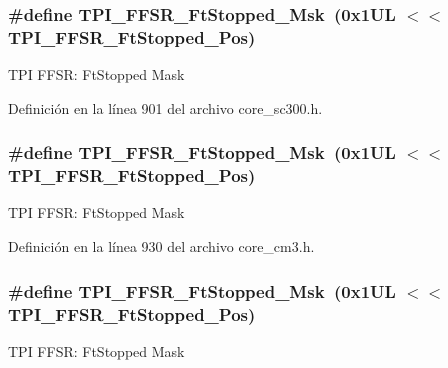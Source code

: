 \subsubsection[{\texorpdfstring{T\+P\+I\+\_\+\+F\+F\+S\+R\+\_\+\+Ft\+Stopped\+\_\+\+Msk}{TPI_FFSR_FtStopped_Msk}}]{\setlength{\rightskip}{0pt plus 5cm}\#define T\+P\+I\+\_\+\+F\+F\+S\+R\+\_\+\+Ft\+Stopped\+\_\+\+Msk~(0x1\+U\+L $<$$<$ T\+P\+I\+\_\+\+F\+F\+S\+R\+\_\+\+Ft\+Stopped\+\_\+\+Pos)}\hypertarget{group___c_m_s_i_s___t_p_i_ga1ab6c3abe1cf6311ee07e7c479ce5f78}{}\label{group___c_m_s_i_s___t_p_i_ga1ab6c3abe1cf6311ee07e7c479ce5f78}
T\+PI F\+F\+SR\+: Ft\+Stopped Mask 

Definición en la línea 901 del archivo core\+\_\+sc300.\+h.

\subsubsection[{\texorpdfstring{T\+P\+I\+\_\+\+F\+F\+S\+R\+\_\+\+Ft\+Stopped\+\_\+\+Msk}{TPI_FFSR_FtStopped_Msk}}]{\setlength{\rightskip}{0pt plus 5cm}\#define T\+P\+I\+\_\+\+F\+F\+S\+R\+\_\+\+Ft\+Stopped\+\_\+\+Msk~(0x1\+U\+L $<$$<$ T\+P\+I\+\_\+\+F\+F\+S\+R\+\_\+\+Ft\+Stopped\+\_\+\+Pos)}\hypertarget{group___c_m_s_i_s___t_p_i_ga1ab6c3abe1cf6311ee07e7c479ce5f78}{}\label{group___c_m_s_i_s___t_p_i_ga1ab6c3abe1cf6311ee07e7c479ce5f78}
T\+PI F\+F\+SR\+: Ft\+Stopped Mask 

Definición en la línea 930 del archivo core\+\_\+cm3.\+h.

\subsubsection[{\texorpdfstring{T\+P\+I\+\_\+\+F\+F\+S\+R\+\_\+\+Ft\+Stopped\+\_\+\+Msk}{TPI_FFSR_FtStopped_Msk}}]{\setlength{\rightskip}{0pt plus 5cm}\#define T\+P\+I\+\_\+\+F\+F\+S\+R\+\_\+\+Ft\+Stopped\+\_\+\+Msk~(0x1\+U\+L $<$$<$ T\+P\+I\+\_\+\+F\+F\+S\+R\+\_\+\+Ft\+Stopped\+\_\+\+Pos)}\hypertarget{group___c_m_s_i_s___t_p_i_ga1ab6c3abe1cf6311ee07e7c479ce5f78}{}\label{group___c_m_s_i_s___t_p_i_ga1ab6c3abe1cf6311ee07e7c479ce5f78}
T\+PI F\+F\+SR\+: Ft\+Stopped Mask 

